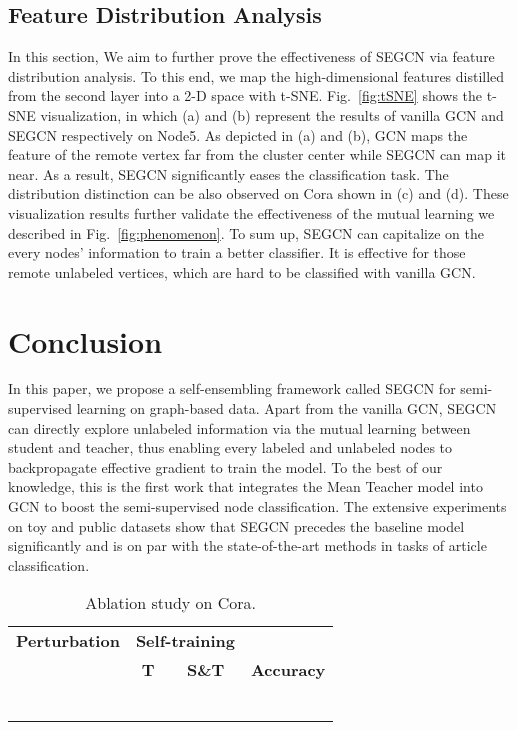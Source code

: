 \documentclass[letterpaper]{article} \usepackage{aaai19}  \usepackage{times}  \usepackage{helvet}  \usepackage{courier}  \usepackage{url}  \usepackage{graphicx}  \usepackage{algorithm}
\begin{document}
\subsection{Feature Distribution Analysis}
In this section, We aim to further prove the effectiveness of SEGCN via feature distribution analysis. To this end, we map the high-dimensional features distilled from the second layer into a 2-D space with t-SNE. Fig.~\ref{fig:tSNE} shows the t-SNE visualization, in which (a) and (b) represent the results of vanilla GCN and SEGCN respectively on Node5.  As depicted in (a) and (b), GCN maps the feature of the remote vertex far from the cluster center while SEGCN can  map it near. As a result, SEGCN significantly eases the classification task. The distribution distinction can be also observed on Cora shown in (c) and (d). These visualization results further validate the effectiveness of the mutual learning we described in Fig.~\ref{fig:phenomenon}. To sum up, SEGCN can capitalize on the every nodes' information to train a better classifier. It is effective for those remote unlabeled vertices, which are hard to be classified with vanilla GCN.

\section{Conclusion}
In this paper, we propose a self-ensembling framework called SEGCN for semi-supervised learning on graph-based data. Apart from the vanilla GCN, SEGCN can directly explore unlabeled information via the mutual learning between student and teacher, thus enabling every labeled and unlabeled nodes to backpropagate effective gradient to train the model. To the best of our knowledge, this is the first work that integrates the Mean Teacher model into GCN to boost the semi-supervised node classification. The extensive experiments on toy and public datasets show that SEGCN precedes the baseline model significantly and is on par with the state-of-the-art methods in tasks of article classification. 

\begin{table}[t]
\caption{Ablation study on Cora.}
\label{tab:ablation}
\vspace{0.095cm}
\centering
\begin{tabular}{ccc|cc|c}
\hline
\multicolumn{3}{c|}{\textbf{Perturbation}} & \multicolumn{2}{c|}{\textbf{Self-training}} & \\
 &   &  & \textbf{T} & \textbf{S\&T} & \textbf{Accuracy}\\ 
\hline
	&			&			&			&			&  \\
		& 	&			&			&			&  \\
		&			& 	&			&			&  \\
		&	& 	&			&			&  \\
		&	& 	& 	&			&  \\
		&	& 	&			& 	&  \\
\hline
\end{tabular}
\end{table}
 


\end{document}
